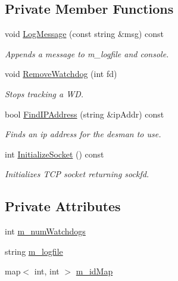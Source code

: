 \subsection*{Private Member Functions}
\begin{DoxyCompactItemize}
\item 
void \hyperlink{classConnectionManager_a27ae126e00f864d3eff03a6a847065cb}{Log\-Message} (const string \&msg) const 
\begin{DoxyCompactList}\small\item\em Appends a message to m\-\_\-logfile and console. \end{DoxyCompactList}\item 
void \hyperlink{classConnectionManager_aaf8571e8eaba2e0dd529ea08ec0c8f6d}{Remove\-Watchdog} (int fd)
\begin{DoxyCompactList}\small\item\em Stops tracking a W\-D. \end{DoxyCompactList}\item 
bool \hyperlink{classConnectionManager_a8d037ebf584dbdef4c4c0dab4819ebea}{Find\-I\-P\-Address} (string \&ip\-Addr) const 
\begin{DoxyCompactList}\small\item\em Finds an ip address for the desman to use. \end{DoxyCompactList}\item 
int \hyperlink{classConnectionManager_a358172b9958938e707ef0f61601fbe67}{Initialize\-Socket} () const 
\begin{DoxyCompactList}\small\item\em Initializes T\-C\-P socket returning sockfd. \end{DoxyCompactList}\end{DoxyCompactItemize}
\subsection*{Private Attributes}
\begin{DoxyCompactItemize}
\item 
int \hyperlink{classConnectionManager_a58b4c08810ff2c3d2c3ab96883ffcccb}{m\-\_\-num\-Watchdogs}
\item 
string \hyperlink{classConnectionManager_a264f750cd43cf4462de3ca17da78d260}{m\-\_\-logfile}
\item 
map$<$ int, int $>$ \hyperlink{classConnectionManager_a1ff4d656a7da7080cf53a9ac7496bde5}{m\-\_\-id\-Map}
\end{DoxyCompactItemize}


